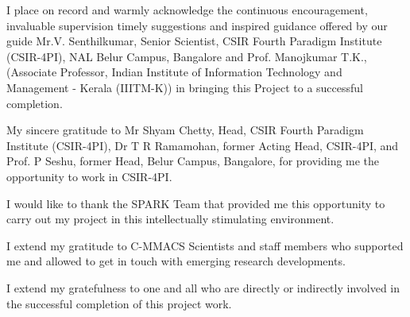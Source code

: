 I place on record and warmly acknowledge the continuous
encouragement, invaluable supervision timely suggestions and inspired
guidance offered by our guide Mr.V. Senthilkumar, Senior Scientist, CSIR
Fourth Paradigm Institute (CSIR-4PI), NAL Belur Campus, Bangalore and
Prof. Manojkumar T.K., (Associate Professor, Indian Institute of Information Technology and Management - Kerala (IIITM-K)) in bringing this Project to a successful completion.

My sincere gratitude to Mr Shyam Chetty, Head, CSIR Fourth
Paradigm Institute (CSIR-4PI), Dr T R Ramamohan, former Acting Head,
CSIR-4PI, and Prof. P Seshu, former Head, Belur Campus, Bangalore, for
providing me the opportunity to work in CSIR-4PI.

I would like to thank the SPARK Team that provided me this
opportunity to carry out my project in this intellectually stimulating environment.

I extend my gratitude to C-MMACS Scientists and staff members
who supported me and allowed to get in touch with emerging research developments.

I extend my gratefulness to one and all who are directly or indirectly
involved in the successful completion of this project work.

